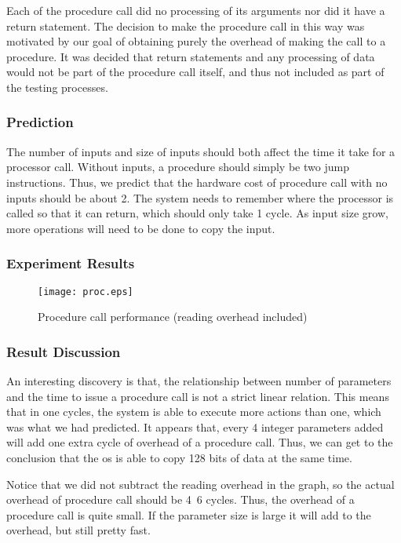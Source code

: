 \documentclass{article} %
\begin{document}
Each of the procedure call did no processing of its arguments nor did it have
a return statement. The decision to make the procedure call in this way was
motivated by our goal of obtaining purely the overhead of making the call to
a procedure. It was decided that return statements and any processing of data
would not be part of the procedure call itself, and thus not included as part
of the testing processes.

\subsubsection{Prediction}
The number of inputs and size of inputs should both affect the time it
take for a processor call. Without inputs, a procedure should simply be two
jump instructions. Thus, we predict that the hardware cost of procedure call
with no inputs should be about 2. The system needs to remember where the
processor is called so that it can return, which should only take 1 cycle. As
input size grow, more operations will need to be done to copy the
input.

\subsubsection{Experiment Results}

\begin{figure}[!htb]
  \centering
  \texttt{[image: proc.eps]}
  \caption{Procedure call performance (reading overhead included)}
  \label{fig:proc}
\end{figure}

\subsubsection{Result Discussion}
An interesting discovery is that, the relationship between number of
parameters and the time to issue a procedure call is not a strict linear
relation. This means that in one cycles, the system is able to execute more actions than one, which was what we had predicted.
It appears that, every 4 integer parameters added will add one extra cycle of
overhead of a procedure call. Thus, we can get to the conclusion that the os
is able to copy 128 bits of data at the same time.

Notice that we did not subtract the reading overhead in the graph, so the
actual overhead of procedure call should be 4~6 cycles. Thus, the overhead of
a procedure call is quite small. If the parameter size is large it will add to
the overhead, but still pretty fast.
\end{document}
